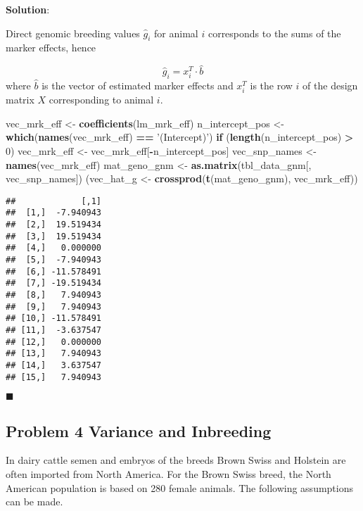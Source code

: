 \documentclass[
]{article}
\newenvironment{Shaded}{\begin{snugshade}}{\end{snugshade}}
\newcommand{\ControlFlowTok}[1]{\textcolor[rgb]{0.13,0.29,0.53}{\textbf{#1}}}
\newcommand{\DecValTok}[1]{\textcolor[rgb]{0.00,0.00,0.81}{#1}}
\newcommand{\KeywordTok}[1]{\textcolor[rgb]{0.13,0.29,0.53}{\textbf{#1}}}
\newcommand{\NormalTok}[1]{#1}
\newcommand{\OperatorTok}[1]{\textcolor[rgb]{0.81,0.36,0.00}{\textbf{#1}}}
\newcommand{\StringTok}[1]{\textcolor[rgb]{0.31,0.60,0.02}{#1}}
\newcommand{\solstart}
{\vspace{3ex}\textbf{Solution}:}
\newcommand{\solend}
{\vspace{2ex}$\blacksquare$}
\begin{document}
\solstart

Direct genomic breeding values \(\hat{g}_i\) for animal \(i\)
corresponds to the sums of the marker effects, hence

\[\hat{g}_i = x_i^T \cdot \hat{b}\] where \(\hat{b}\) is the vector of
estimated marker effects and \(x_i^T\) is the row \(i\) of the design
matrix \(X\) corresponding to animal \(i\).

\begin{Shaded}
\begin{Highlighting}[]
\NormalTok{vec_mrk_eff <-}\StringTok{ }\KeywordTok{coefficients}\NormalTok{(lm_mrk_eff)}
\NormalTok{n_intercept_pos <-}\StringTok{ }\KeywordTok{which}\NormalTok{(}\KeywordTok{names}\NormalTok{(vec_mrk_eff) }\OperatorTok{==}\StringTok{ '(Intercept)'}\NormalTok{)}
\ControlFlowTok{if}\NormalTok{ (}\KeywordTok{length}\NormalTok{(n_intercept_pos) }\OperatorTok{>}\StringTok{ }\DecValTok{0}\NormalTok{) vec_mrk_eff <-}\StringTok{ }\NormalTok{vec_mrk_eff[}\OperatorTok{-}\NormalTok{n_intercept_pos]}
\NormalTok{vec_snp_names <-}\StringTok{ }\KeywordTok{names}\NormalTok{(vec_mrk_eff)}
\NormalTok{mat_geno_gnm <-}\StringTok{ }\KeywordTok{as.matrix}\NormalTok{(tbl_data_gnm[, vec_snp_names])}
\NormalTok{(vec_hat_g <-}\StringTok{ }\KeywordTok{crossprod}\NormalTok{(}\KeywordTok{t}\NormalTok{(mat_geno_gnm), vec_mrk_eff))}
\end{Highlighting}
\end{Shaded}

\begin{verbatim}
##             [,1]
##  [1,]  -7.940943
##  [2,]  19.519434
##  [3,]  19.519434
##  [4,]   0.000000
##  [5,]  -7.940943
##  [6,] -11.578491
##  [7,] -19.519434
##  [8,]   7.940943
##  [9,]   7.940943
## [10,] -11.578491
## [11,]  -3.637547
## [12,]   0.000000
## [13,]   7.940943
## [14,]   3.637547
## [15,]   7.940943
\end{verbatim}

\solend

\clearpage
\pagebreak

\hypertarget{problem-4-variance-and-inbreeding}{%
\subsection{Problem 4 Variance and
Inbreeding}\label{problem-4-variance-and-inbreeding}}

In dairy cattle semen and embryos of the breeds Brown Swiss and Holstein
are often imported from North America. For the Brown Swiss breed, the
North American population is based on 280 female animals. The following
assumptions can be made.
\end{document}

